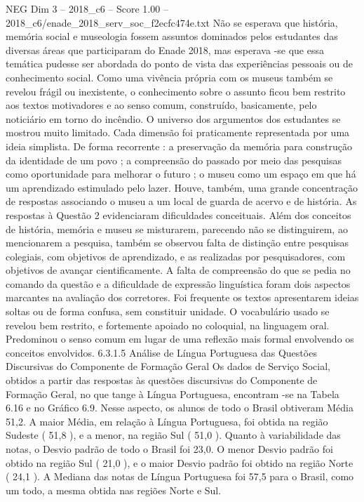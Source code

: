 \begin{textsample}{NEG Dim 3 – 2018\_c6 – Score 1.00 – 2018\_c6/enade\_2018\_serv\_soc\_f2ecfc474e.txt}
Não se esperava que história, memória social e museologia fossem assuntos dominados pelos estudantes das diversas áreas que participaram do Enade 2018, mas esperava -se que essa temática pudesse ser abordada do ponto de vista das experiências pessoais ou de conhecimento social.
Como uma vivência própria com os museus também se revelou frágil ou inexistente, o conhecimento sobre o assunto ficou bem restrito aos textos motivadores e ao senso comum, construído, basicamente, pelo noticiário em torno do incêndio.
O universo dos argumentos dos estudantes se mostrou muito limitado.
Cada dimensão foi praticamente representada por uma ideia simplista.
De forma recorrente : a preservação da memória para construção da identidade de um povo ; a compreensão do passado por meio das pesquisas como oportunidade para melhorar o futuro ; o museu como um espaço em que há um aprendizado estimulado pelo lazer.
Houve, também, uma grande concentração de respostas associando o museu a um local de guarda de acervo e de história.
As respostas à Questão 2 evidenciaram dificuldades conceituais.
Além dos conceitos de história, memória e museu se misturarem, parecendo não se distinguirem, ao mencionarem a pesquisa, também se observou falta de distinção entre pesquisas colegiais, com objetivos de aprendizado, e as realizadas por pesquisadores, com objetivos de avançar cientificamente.
A falta de compreensão do que se pedia no comando da questão e a dificuldade de expressão linguística foram dois aspectos marcantes na avaliação dos corretores.
Foi frequente os textos apresentarem ideias soltas ou de forma confusa, sem constituir unidade.
O vocabulário usado se revelou bem restrito, e fortemente apoiado no coloquial, na linguagem oral.
Predominou o senso comum em lugar de uma reflexão mais formal envolvendo os conceitos envolvidos. 6.3.1.5 Análise de Língua Portuguesa das Questões Discursivas do Componente de Formação Geral Os dados de Serviço Social, obtidos a partir das respostas às questões discursivas do Componente de Formação Geral, no que tange à Língua Portuguesa, encontram -se na Tabela 6.16 e no Gráfico 6.9.
Nesse aspecto, os alunos de todo o Brasil obtiveram Média 51,2.
A maior Média, em relação à Língua Portuguesa, foi obtida na região Sudeste ( 51,8 ), e a menor, na região Sul ( 51,0 ).
Quanto à variabilidade das notas, o Desvio padrão de todo o Brasil foi 23,0.
O menor Desvio padrão foi obtido na região Sul ( 21,0 ), e o maior Desvio padrão foi obtido na região Norte ( 24,1 ).
A Mediana das notas de Língua Portuguesa foi 57,5 para o Brasil, como um todo, a mesma obtida nas regiões Norte e Sul.

\end{textsample}
